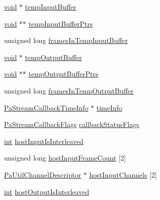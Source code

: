 \begin{DoxyCompactItemize}
\item 
\hyperlink{sound_8c_ae35f5844602719cf66324f4de2a658b3}{void} $\ast$ \hyperlink{struct_pa_util_buffer_processor_a327f8e240df961caa6c47bb9a35a9b76}{temp\+Input\+Buffer}
\item 
\hyperlink{sound_8c_ae35f5844602719cf66324f4de2a658b3}{void} $\ast$$\ast$ \hyperlink{struct_pa_util_buffer_processor_ad4fa78d30f36f82c45278b9fda2322f9}{temp\+Input\+Buffer\+Ptrs}
\item 
unsigned long \hyperlink{struct_pa_util_buffer_processor_a8b1a7ccf36beec18977244c4dd9c6af2}{frames\+In\+Temp\+Input\+Buffer}
\item 
\hyperlink{sound_8c_ae35f5844602719cf66324f4de2a658b3}{void} $\ast$ \hyperlink{struct_pa_util_buffer_processor_a6aaded76991a6014bc78290fca38124e}{temp\+Output\+Buffer}
\item 
\hyperlink{sound_8c_ae35f5844602719cf66324f4de2a658b3}{void} $\ast$$\ast$ \hyperlink{struct_pa_util_buffer_processor_a893544dc94d125b204167cf61f87ff9a}{temp\+Output\+Buffer\+Ptrs}
\item 
unsigned long \hyperlink{struct_pa_util_buffer_processor_a7cb25636fa0e415bdbd87469b5fa4a03}{frames\+In\+Temp\+Output\+Buffer}
\item 
\hyperlink{struct_pa_stream_callback_time_info}{Pa\+Stream\+Callback\+Time\+Info} $\ast$ \hyperlink{struct_pa_util_buffer_processor_addae164599da4e3cad4498350cc9e39e}{time\+Info}
\item 
\hyperlink{portaudio_8h_a55a005924bcfa0424594f4f65cd4ae82}{Pa\+Stream\+Callback\+Flags} \hyperlink{struct_pa_util_buffer_processor_a269d950005d05b2c15d13d0e643c936e}{callback\+Status\+Flags}
\item 
\hyperlink{xmltok_8h_a5a0d4a5641ce434f1d23533f2b2e6653}{int} \hyperlink{struct_pa_util_buffer_processor_a5bcaa1f67c5f868a2947c1026880f6d6}{host\+Input\+Is\+Interleaved}
\item 
unsigned long \hyperlink{struct_pa_util_buffer_processor_a9a72a362c2a3b03b6badd0ecfd72837c}{host\+Input\+Frame\+Count} \mbox{[}2\mbox{]}
\item 
\hyperlink{struct_pa_util_channel_descriptor}{Pa\+Util\+Channel\+Descriptor} $\ast$ \hyperlink{struct_pa_util_buffer_processor_a03ea3d7816db14d4fc8ee8bde013d99e}{host\+Input\+Channels} \mbox{[}2\mbox{]}
\item 
\hyperlink{xmltok_8h_a5a0d4a5641ce434f1d23533f2b2e6653}{int} \hyperlink{struct_pa_util_buffer_processor_a3be5c10e3f9e36326103443929547e25}{host\+Output\+Is\+Interleaved}
\item 

\end{DoxyCompactItemize}
